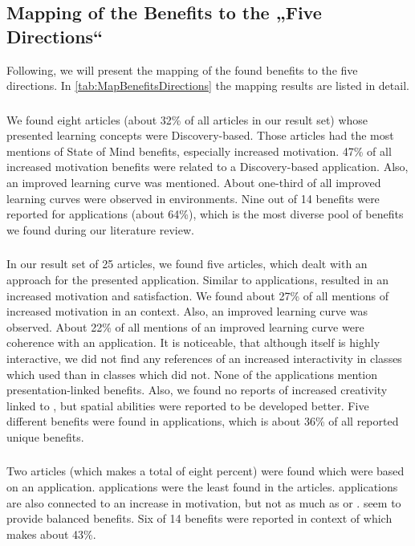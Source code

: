 \subsection{Mapping of the Benefits to the „Five Directions“}
\label{subsec:Mapping}
Following, we will present the mapping of the found benefits to the five directions. In \ref{tab:MapBenefitsDirections} the mapping results are listed in detail. 

\subsubsection{\DBLns}
We found eight articles (about 32\% of all articles in our result set) whose presented learning concepts were Discovery-based. Those articles had the most mentions of State of Mind benefits, especially increased motivation. 47\% of all increased motivation benefits were related to a Discovery-based \AR application. Also, an improved learning curve was mentioned. About one-third of all improved learning curves were observed in \DBL environments. Nine out of 14 benefits were reported for \DBL applications (about 64\%), which is the most diverse pool of benefits we found during our literature review.

\subsubsection{\OMns}
In our result set of 25 articles, we found five articles, which dealt with an \OM approach for the presented \AR application. Similar to \DBL applications, \OM resulted in an increased motivation and satisfaction. We found about 27\% of all mentions of increased motivation in an \OM context. Also, an improved learning curve was observed. About 22\% of all mentions of an improved learning curve were coherence with an \OM application. It is noticeable, that although \OM itself is highly interactive, we did not find any references of an increased interactivity in classes which used \AR than in classes which did not. None of the \OM applications mention presentation-linked benefits. Also, we found no reports of increased creativity linked to \OM, but spatial abilities were reported to be developed better. Five different benefits were found in \OM applications, which is about 36\% of all reported unique benefits.

\subsubsection{\ARBns}
Two articles (which makes a total of eight percent) were found which were based on an \ARB application. \ARB applications were the least found in the articles. \ARB applications are also connected to an increase in motivation, but not as much as \DBL or \OMns. \ARB seem to provide balanced benefits. Six of 14 benefits were reported in context of \ARB which makes about 43\%.

